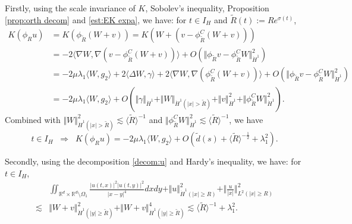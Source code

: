 \documentclass[reqno, 11pt]{amsart}
\numberwithin{equation}{section}
\newcommand{\R}{\mathbb{R}}
\theoremstyle{plain}
\theoremstyle{definition}
\numberwithin{equation}{section}
\numberwithin{theorem}{section}
\numberwithin{equation}{section}
\numberwithin{equation}{section}
\numberwithin{theorem}{section}
\begin{document}
	Firstly, using the scale invariance of $K$, Sobolev's inequality, Proposition \ref{prop:orth decom} and \eqref{est:EK expa}, we have: for $t\in I_H$ and $\widetilde{R}(t):=Re^{\sigma(t)}$,
	\begin{equation*}
	\begin{aligned}
	K\left(\phi_{R}u\right)&=K\left(\phi_{\widetilde{R}}(W+v)\right)=K\left(W+ \left(v-\phi_{\widetilde{R}}^{C}(W+v) \right)\right)\\&=-2\langle \nabla W,\nabla \left( v-\phi_{\widetilde{R}}^{C}(W+v) \right) \rangle+O\left(\Vert \phi_{\widetilde{R}}v-\phi_{\widetilde{R}}^{C}W\Vert_{\dot H^1}^2\right)\\&=-2\mu\lambda_{1} \langle W,g_2\rangle+2\langle \Delta W,\gamma\rangle+2\langle \nabla W,\nabla \left( \phi_{\widetilde{R}}^{C}(W+v) \right) \rangle+O\left(\Vert \phi_{\widetilde{R}}v-\phi_{\widetilde{R}}^{C}W\Vert_{\dot H^1}^2\right)\\&=-2\mu\lambda_{1} \langle W,g_2\rangle+O\left( \Vert \gamma \Vert_{\dot H^1}+\Vert W \Vert_{\dot H^1(|x|>\widetilde{R})}
	+\Vert v \Vert_{\dot H^1}^2+\Vert \phi_{\widetilde{R}}^{C}W \Vert_{\dot H^1}^2 \right).
	\end{aligned}
	\end{equation*}
	Combined with $\Vert W \Vert_{\dot H^1(|x|>\widetilde{R})}^2\lesssim \langle \widetilde{R} \rangle^{-1} $ and $\Vert \phi_{\widetilde{R}}^{C}W \Vert_{\dot H^1}^2 \lesssim \langle \widetilde{R} \rangle^{-1}$, we have
	\begin{equation}\label{est:IH Kcutf}
	t\in I_H\;\;\Longrightarrow\;\; K\left(\phi_{R}u\right)=-2\mu\lambda_{1} \langle W,g_2\rangle+O\left( \widetilde{d}(s)+\langle \widetilde{R} \rangle^{-\frac{1}{2}}+\lambda_{1}^2 \right).
	\end{equation}
	
	Secondly, using the decomposition \eqref{decom:u} and Hardy's inequality, we have: for $t\in I_H$,
	\begin{equation}\label{est:IH remn}
	\begin{aligned}
	&\iint_{\R^d\times \R^d \setminus \varOmega_1} \frac{\big|u(t,x)\big|^2\big|u(t,y)\big|^2}{|x-y|^4} dxdy+\Vert u \Vert_{\dot H^1(|x|\geq R)}^2+\Vert \frac{u}{|x|} \Vert_{L^2(|x|\geq R)}^2\\\lesssim&\Vert W+v\Vert_{\dot H^1(|y|\geq \widetilde{R})}^2+\Vert W+v\Vert_{\dot H^1(|y|\geq \widetilde{R})}^4\lesssim \langle \widetilde{R} \rangle^{-1}+\lambda_{1}^2.
	\end{aligned}
	\end{equation}
	
\end{document}
